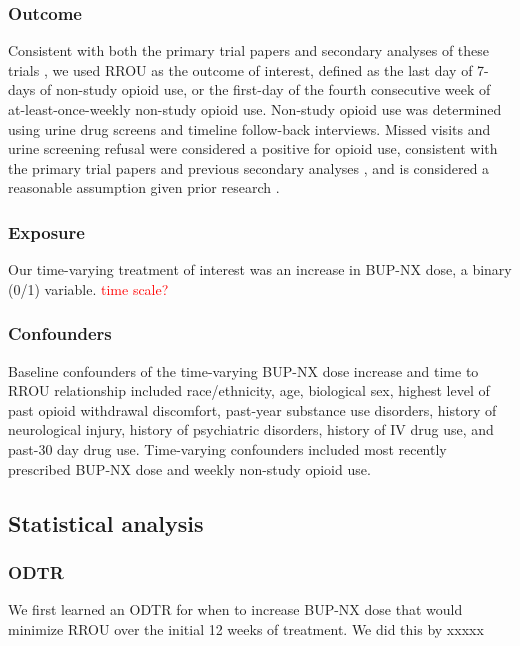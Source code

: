 \documentclass[11pt]{article}
\begin{document}
\subsubsection*{Outcome}

Consistent with both the primary trial papers \citep{} and secondary analyses of these trials \citep{rudolph2022dose}, we used RROU as the outcome of interest, defined as the last day of 7-days of non-study opioid use, or the first-day of the fourth consecutive week of at-least-once-weekly non-study opioid use. Non-study opioid use was determined using urine drug screens and timeline follow-back interviews. Missed visits and urine screening refusal were considered a positive for opioid use, consistent with the primary trial papers and previous secondary analyses \citep{}, and is considered a reasonable assumption given prior research \citep{}.

\subsubsection*{Exposure}

Our time-varying treatment of interest was an increase in BUP-NX dose, a binary (0/1) variable. \textcolor{red}{time scale?}

\subsubsection*{Confounders}

Baseline confounders of the time-varying BUP-NX dose increase and time to RROU relationship included race/ethnicity, age, biological sex, highest level of past opioid withdrawal discomfort, past-year substance use disorders, history of neurological injury, history of psychiatric disorders, history of IV drug use, and past-30 day drug use. Time-varying confounders included most recently prescribed BUP-NX dose and weekly non-study opioid use.

\subsection{Statistical analysis}

\subsubsection*{ODTR}

We first learned an ODTR for when to increase BUP-NX dose that would minimize RROU over the initial 12 weeks of treatment. We did this by xxxxx
\end{document}
